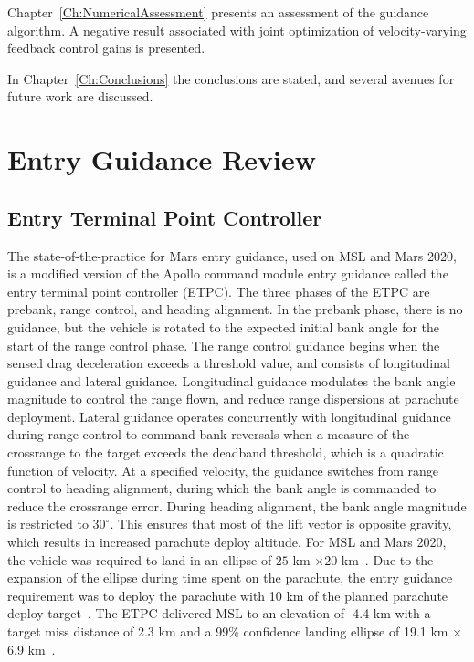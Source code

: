 Chapter~\ref{Ch:NumericalAssessment} presents an assessment of the guidance algorithm.  A negative result associated with joint optimization of velocity-varying feedback control gains is presented. 

In Chapter~\ref{Ch:Conclusions} the conclusions are stated, and several avenues for future work are discussed.

\section{Entry Guidance Review}
\subsection{Entry Terminal Point Controller}\label{Sec:ETPC}
The state-of-the-practice for Mars entry guidance, used on MSL and Mars 2020, is a modified version of the Apollo command module entry guidance \cite{MSL_EDL2} called the entry terminal point controller (ETPC). 
The three phases of the ETPC are prebank, range control, and heading alignment. In the prebank phase, there is no guidance, but the vehicle is rotated to the expected initial bank angle for the start of the range control phase.
The range control guidance begins when the sensed drag deceleration exceeds a threshold value, and consists of longitudinal guidance and lateral guidance. Longitudinal guidance modulates the bank angle magnitude to control the range flown, and reduce range dispersions at parachute deployment. Lateral guidance operates concurrently with longitudinal guidance during range control to command bank reversals when a measure of the crossrange to the target exceeds the deadband threshold, which is a quadratic function of velocity. At a specified velocity, the guidance switches from range control to heading alignment, during which the bank angle is commanded to reduce the crossrange error. During heading alignment, the bank angle magnitude is restricted to $30^{\circ}$. This ensures that most of the lift vector is opposite gravity, which results in increased parachute deploy altitude.
For MSL and Mars 2020, the vehicle was required to land in an ellipse of $25$ km $\times 20$ km~\cite{MSL_EDL2,M2020_EDL}. Due to the expansion of the ellipse during time spent on the parachute, the entry guidance requirement was to deploy the parachute with 10 km of the planned parachute deploy target~\cite{MSL_EDL2}. The ETPC delivered MSL to an elevation of -4.4 km with a target miss distance of 2.3 km and a 99\% confidence landing ellipse of 19.1 km $\times$ 6.9 km~\cite{MSL_EDL2}.


